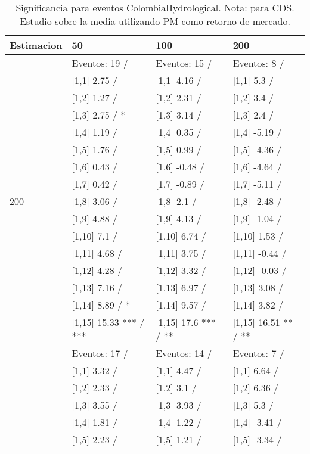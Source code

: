 \begin{table}

\caption{Significancia para eventos ColombiaHydrological. Nota: para CDS. Estudio sobre la media utilizando PM como retorno de mercado.}
\centering
\begin{tabular}[t]{llll}
\toprule
Estimacion & 50 & 100 & 200\\
\midrule
 & Eventos:  19 / & Eventos:  15 / & Eventos:  8 /\\
 & {}[1,1] 2.75  / & {}[1,1] 4.16  / & {}[1,1] 5.3  /\\
 & {}[1,2] 1.27  / & {}[1,2] 2.31  / & {}[1,2] 3.4  /\\
 & {}[1,3] 2.75  / * & {}[1,3] 3.14  / & {}[1,3] 2.4  /\\
 & {}[1,4] 1.19  / & {}[1,4] 0.35  / & {}[1,4] -5.19  /\\
\addlinespace
 & {}[1,5] 1.76  / & {}[1,5] 0.99  / & {}[1,5] -4.36  /\\
 & {}[1,6] 0.43  / & {}[1,6] -0.48  / & {}[1,6] -4.64  /\\
 & {}[1,7] 0.42  / & {}[1,7] -0.89  / & {}[1,7] -5.11  /\\
200 & {}[1,8] 3.06  / & {}[1,8] 2.1  / & {}[1,8] -2.48  /\\
 & {}[1,9] 4.88  / & {}[1,9] 4.13  / & {}[1,9] -1.04  /\\
\addlinespace
 & {}[1,10] 7.1  / & {}[1,10] 6.74  / & {}[1,10] 1.53  /\\
 & {}[1,11] 4.68  / & {}[1,11] 3.75  / & {}[1,11] -0.44  /\\
 & {}[1,12] 4.28  / & {}[1,12] 3.32  / & {}[1,12] -0.03  /\\
 & {}[1,13] 7.16  / & {}[1,13] 6.97  / & {}[1,13] 3.08  /\\
 & {}[1,14] 8.89  / * & {}[1,14] 9.57  / & {}[1,14] 3.82  /\\
\addlinespace
 & {}[1,15] 15.33 *** / *** & {}[1,15] 17.6 *** / ** & {}[1,15] 16.51 ** / **\\
 & Eventos:  17 / & Eventos:  14 / & Eventos:  7 /\\
 & {}[1,1] 3.32  / & {}[1,1] 4.47  / & {}[1,1] 6.64  /\\
 & {}[1,2] 2.33  / & {}[1,2] 3.1  / & {}[1,2] 6.36  /\\
 & {}[1,3] 3.55  / & {}[1,3] 3.93  / & {}[1,3] 5.3  /\\
\addlinespace
 & {}[1,4] 1.81  / & {}[1,4] 1.22  / & {}[1,4] -3.41  /\\
 & {}[1,5] 2.23  / & {}[1,5] 1.21  / & {}[1,5] -3.34  /\\

\end{tabular}
\end{table}
